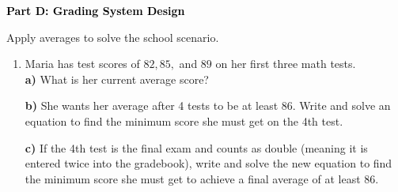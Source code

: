 \documentclass[12pt, letterpaper, fleqn]{article}
\begin{document}
\newpage

\begin{tcolorbox}[colback=black!10]
    \large\textcolor{black}{\textbf{Part D: Grading System Design}}
\end{tcolorbox}

\vspace{3mm}

\noindent
Apply averages to solve the school scenario.

\vspace{5mm}

\begin{enumerate}[itemsep=2.5cm, leftmargin=0.6cm]
\item Maria has test scores of $82, 85,$ and $89$ on her first three math tests. \\
\textbf{a)} What is her current average score? \\
\vspace{4cm}

\textbf{b)} She wants her average after 4 tests to be at least $86$. Write and solve an equation to find the minimum score she must get on the 4th test. \\
\vspace{4cm}

\textbf{c)} If the 4th test is the final exam and counts as double (meaning it is entered twice into the gradebook), write and solve the new equation to find the minimum score she must get to achieve a final average of at least $86$. \\
\vspace{4cm}

\end{enumerate}
\end{document}
